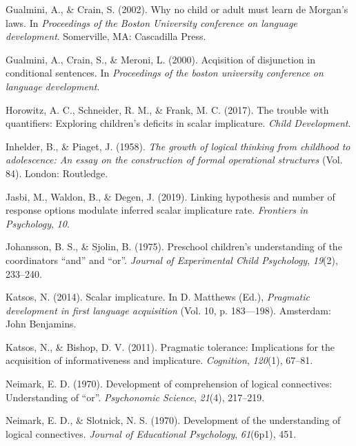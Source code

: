 \documentclass[,man,floatsintext]{apa6}
\begin{document}
\leavevmode\hypertarget{ref-gualminicrain2002}{}%
Gualmini, A., \& Crain, S. (2002). Why no child or adult must learn de Morgan's laws. In \emph{Proceedings of the Boston University conference on language development}. Somerville, MA: Cascadilla Press.

\leavevmode\hypertarget{ref-gualmini2000}{}%
Gualmini, A., Crain, S., \& Meroni, L. (2000). Acqisition of disjunction in conditional sentences. In \emph{Proceedings of the boston university conference on language development}.

\leavevmode\hypertarget{ref-horowitz2017trouble}{}%
Horowitz, A. C., Schneider, R. M., \& Frank, M. C. (2017). The trouble with quantifiers: Exploring children's deficits in scalar implicature. \emph{Child Development}.

\leavevmode\hypertarget{ref-piaget1958growth}{}%
Inhelder, B., \& Piaget, J. (1958). \emph{The growth of logical thinking from childhood to adolescence: An essay on the construction of formal operational structures} (Vol. 84). London: Routledge.

\leavevmode\hypertarget{ref-jasbi2019linking}{}%
Jasbi, M., Waldon, B., \& Degen, J. (2019). Linking hypothesis and number of response options modulate inferred scalar implicature rate. \emph{Frontiers in Psychology}, \emph{10}.

\leavevmode\hypertarget{ref-johansson1975preschool}{}%
Johansson, B. S., \& Sjolin, B. (1975). Preschool children's understanding of the coordinators ``and'' and ``or''. \emph{Journal of Experimental Child Psychology}, \emph{19}(2), 233--240.

\leavevmode\hypertarget{ref-katsos2014scalar}{}%
Katsos, N. (2014). Scalar implicature. In D. Matthews (Ed.), \emph{Pragmatic development in first language acquisition} (Vol. 10, p. 183---198). Amsterdam: John Benjamins.

\leavevmode\hypertarget{ref-katsos2011pragmatic}{}%
Katsos, N., \& Bishop, D. V. (2011). Pragmatic tolerance: Implications for the acquisition of informativeness and implicature. \emph{Cognition}, \emph{120}(1), 67--81.

\leavevmode\hypertarget{ref-neimark1970}{}%
Neimark, E. D. (1970). Development of comprehension of logical connectives: Understanding of ``or''. \emph{Psychonomic Science}, \emph{21}(4), 217--219.

\leavevmode\hypertarget{ref-neimarkSlotnick1970}{}%
Neimark, E. D., \& Slotnick, N. S. (1970). Development of the understanding of logical connectives. \emph{Journal of Educational Psychology}, \emph{61}(6p1), 451.
\end{document}
